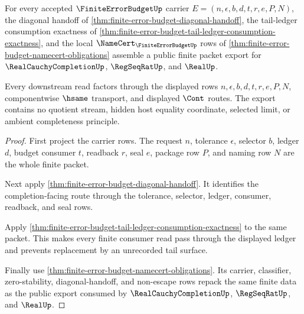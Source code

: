 \begin{theorem}
\label{thm:finite-error-budget-public-export}
For every accepted $\FiniteErrorBudgetUp$ carrier
$E=(n,\epsilon,b,d,t,r,e,P,N)$, the diagonal handoff of
\autoref{thm:finite-error-budget-diagonal-handoff}, the tail-ledger
consumption exactness of
\autoref{thm:finite-error-budget-tail-ledger-consumption-exactness}, and the
local $\NameCert_{\FiniteErrorBudgetUp}$ rows of
\autoref{thm:finite-error-budget-namecert-obligations} assemble a public finite
packet export for $\RealCauchyCompletionUp$, $\RegSeqRatUp$, and $\RealUp$.

Every downstream read factors through the displayed rows
$n,\epsilon,b,d,t,r,e,P,N$, componentwise $\hsame$ transport, and displayed
$\Cont$ routes. The export contains no quotient stream, hidden host equality
coordinate, selected limit, or ambient completeness principle.
\end{theorem}
\begin{proof}
First project the carrier rows. The request $n$, tolerance $\epsilon$, selector
$b$, ledger $d$, budget consumer $t$, readback $r$, seal $e$, package row $P$,
and naming row $N$ are the whole finite packet.

Next apply \autoref{thm:finite-error-budget-diagonal-handoff}. It identifies
the completion-facing route through the tolerance, selector, ledger, consumer,
readback, and seal rows.

Apply \autoref{thm:finite-error-budget-tail-ledger-consumption-exactness} to
the same packet. This makes every finite consumer read pass through the
displayed ledger and prevents replacement by an unrecorded tail surface.

Finally use \autoref{thm:finite-error-budget-namecert-obligations}. Its
carrier, classifier, zero-stability, diagonal-handoff, and non-escape rows
repack the same finite data as the public export consumed by
$\RealCauchyCompletionUp$, $\RegSeqRatUp$, and $\RealUp$.
\end{proof}

